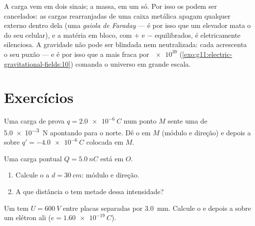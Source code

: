 \begin{remark}\label{rem:g11:electric-gravitational-fields:noanalogue}
A carga vem em dois sinais; a massa, em um só. Por isso os  podem ser cancelados: as cargas rearranjadas de uma caixa
metálica apagam qualquer  externo dentro dela (uma \emph{gaiola de
Faraday} --- é por isso que um elevador mata o  do seu celular), e a
matéria em bloco, com $+$ e $-$ equilibrados, é eletricamente silenciosa.
A gravidade não pode ser blindada nem neutralizada: cada 
acrescenta o seu puxão --- e é por isso que a  mais fraca por
$\num{e39}$ (\cref{exo:g11:electric-gravitational-fields:10}) comanda o
universo em grande escala.
\end{remark}

\section{Exercícios}

\begin{exercise}[$\star$]\label{exo:g11:electric-gravitational-fields:1}
Uma carga de prova $q = \qty{+2.0e-6}{C}$ num ponto $M$ sente uma 
de \qty{5.0e-3}{N} apontando para o norte. Dê o  em $M$ (módulo e
direção) e depois a  sobre $q' = \qty{-4.0e-6}{C}$ colocada em $M$.
\end{exercise}

\begin{exercise}[$\star$]\label{exo:g11:electric-gravitational-fields:2}
Uma carga pontual $Q = \qty{+5.0}{nC}$ está em $O$.
\begin{enumerate}
  \item Calcule o  a $d = \qty{30}{cm}$: módulo e direção.
  \item A que distância o  tem metade dessa intensidade?
\end{enumerate}
\end{exercise}

\begin{exercise}[$\star$]\label{exo:g11:electric-gravitational-fields:3}
Um  tem $U = \qty{600}{V}$ entre placas separadas por
\qty{3.0}{mm}. Calcule o  e depois a  sobre um elétron ali
($e = \qty{1.60e-19}{C}$).
\end{exercise}

